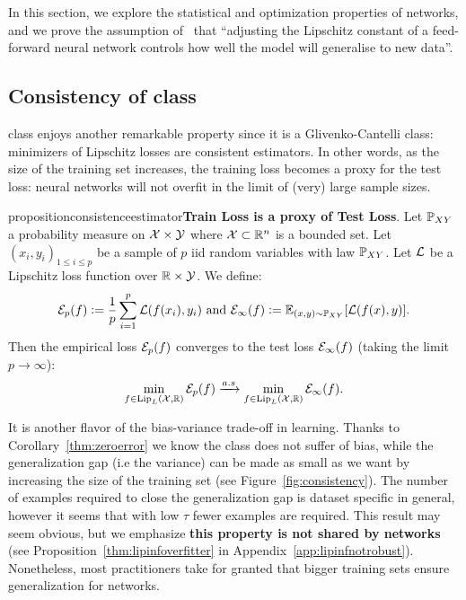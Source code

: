 In this section, we explore the statistical and optimization properties of \LipCl networks, and we prove the assumption of~\cite{gouk2021regularisation} that ``adjusting the Lipschitz constant of a feed-forward neural network controls how well the model will generalise to new data''. 
    \vspace{-1mm}
    \subsection{Consistency of \LipCl class}\label{sec:consistency}
  
        \LipCl class enjoys another remarkable property since it is a Glivenko-Cantelli class: minimizers of Lipschitz losses are consistent estimators. In other words, as the size of the training set increases, the training loss becomes a proxy for the test loss: \LipCl neural networks will not overfit in the limit of (very) large sample sizes.  
          
        \begin{restatable}{proposition}{consistenceestimator}{\normalfont\textbf{Train Loss is a proxy of Test Loss}.}\label{thm:consistenceestimator}
            Let $\mathbb{P}_{XY}$ a probability measure on $\mathcal{X}\times\mathcal{Y}$ where $\mathcal{X}\subset\mathbb{R}^n$ is a bounded set. Let $(x_i,y_i)_{1\leq i\leq p}$ be a sample of $p$ iid random variables with law $\mathbb{P}_{XY}$. Let $\mathcal{L}$ be a Lipschitz loss function over $\mathbb{R}\times\mathcal{Y}$. We define:
            \begin{equation}
                \mathcal{E}_p(f)\vcentcolon=\frac{1}{p}\sum_{i=1}^p\mathcal{L}(f(x_i),y_i)\text{ and }\mathcal{E}_{\infty}(f)\vcentcolon=\mathbb{E}_{(x,y)\sim \mathbb{P}_{XY}}[\mathcal{L}(f(x),y)].
            \end{equation}
            Then the empirical loss $\mathcal{E}_p(f)$ converges to the test loss $\mathcal{E}_{\infty}(f)$ (taking the limit $p\rightarrow\infty$):
            \begin{equation}
                \min_{f\in\text{Lip}_L(\mathcal{X},\mathbb{R})}\mathcal{E}_p(f)\xrightarrow{a.s}\min_{f\in\text{Lip}_L(\mathcal{X},\mathbb{R})}\mathcal{E}_{\infty}(f).
            \end{equation}
        \end{restatable}
          
        It is another flavor of the bias-variance trade-off in learning. Thanks to Corollary~\ref{thm:zeroerror} we know the \LipCl class does not suffer of bias, while the generalization gap (i.e the variance) can be made as small as we want by increasing the size of the training set (see Figure~\ref{fig:consistency}). The number of examples required to close the generalization gap is dataset specific in general, however it seems that with low $\tau$ fewer examples are required. This result may seem obvious, but we emphasize \textbf{this property is not shared by \LipInf networks} (see Proposition~\ref{thm:lipinfoverfitter} in Appendix~\ref{app:lipinfnotrobust}). Nonetheless, most practitioners take for granted that bigger training sets ensure generalization for \LipInf networks.       
          

